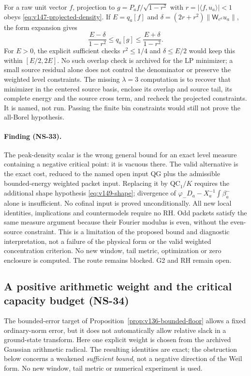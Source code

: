 \documentclass[11pt]{article}
\theoremstyle{remark}
\begin{document}
For a raw unit vector $f$, projection to
$g=P_af/\sqrt{1-r^2}$ with $r=|\langle f,u_a\rangle|<1$ obeys
\eqref{eq:v147-projected-density}. If $E=q_a[f]$ and
$\delta=(2r+r^2)\|\mathsf W_{e^a}u_a\|$, the form expansion gives
\[
 \frac{E-\delta}{1-r^2}\le q_a[g]\le\frac{E+\delta}{1-r^2}.
\]
For $E>0$, the explicit sufficient checks $r^2\le1/4$ and
$\delta\le E/2$ would keep this within $[E/2,2E]$. No such overlap
check is archived for the LP minimizer; a small source residual alone
does not control the denominator or preserve the weighted level
constraints. The missing $\lambda=3$ computation is to recover that
minimizer in the centered source basis, enclose its overlap and source
tail, its complete energy and the source cross term, and recheck the
projected constraints. It is named, not run. Passing the finite bin
constraints would still not prove the all-Borel hypothesis.

\paragraph{Finding (NS-33).}
The peak-density scalar is the wrong general bound for an exact level
measure containing a negative critical point: it is vacuous there.
The valid alternative is the exact cost, reduced to the named open
input QG plus the admissible bounded-energy weighted packet input.
Replacing it by $\mathrm{QC}_1/K$ requires the additional shape
hypothesis \eqref{eq:v149-shape}; divergence of
$\varphi_-D_a-X_a^{-1}\int\beta_a^-$ alone is insufficient. No cofinal
input is proved unconditionally. All new local identities, implications
and countermodels require no RH. Odd packets satisfy the same measure
argument because their Fourier modulus is even, without the even-source
constraint. This is a limitation of the proposed bound and diagnostic
interpretation, not a failure of the physical form or the valid weighted
concentration criterion. No new window, tail metric, optimization or zero
enclosure is computed. The route remains blocked. G2 and RH remain open.


\subsection*{A positive arithmetic weight and the critical capacity budget (NS-34)}

The bounded-error target of Proposition~\ref{prop:v136-bounded-floor}
allows a fixed ordinary-norm error, but it does not automatically allow
relative slack in a ground-state transform. Here one explicit weight is
chosen from the archived Gaussian arithmetic radical. The resulting
identities are exact; the obstruction below concerns a weakened
\emph{sufficient bound}, not a negative direction of the Weil form.
No new window, tail metric or numerical experiment is used.
\end{document}
